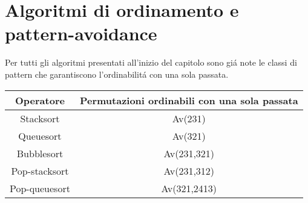 \section*{Algoritmi di ordinamento e pattern-avoidance}
Per tutti gli algoritmi presentati all'inizio del capitolo 
sono gi\'a note le classi di {pattern} che garantiscono l'ordinabilit\'a con una sola passata. 
\begin{center}
\begin{tabular}{ |c|c| } 
\hline
\textbf{Operatore} & \textbf{Permutazioni ordinabili con una sola passata} \\ 
\hline
Stacksort\cite{limbrief} & Av(231)\\ 
Queuesort\cite{cioni2021preimages} & Av(321)\\ 
Bubblesort\cite{albert2010inverse} & Av(231,321)\\ 
Pop-stacksort\cite{magnusson2013sorting} & Av(231,312)\\ 
Pop-queuesort\cite{cioni2021sorting}& Av(321,2413)\\ 
\hline
\end{tabular}
\end{center}